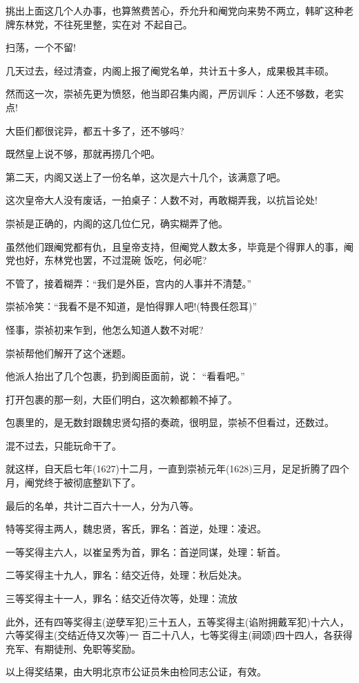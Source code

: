 \documentclass[11pt,a4paper,onecolumn]{article}
\begin{document}
挑出上面这几个人办事，也算煞费苦心，乔允升和阉党向来势不两立，韩旷这种老牌东林党，不往死里整，实在对
不起自己。

扫荡，一个不留!

几天过去，经过清查，内阁上报了阉党名单，共计五十多人，成果极其丰硕。

然而这一次，崇祯先更为愤怒，他当即召集内阁，严厉训斥：人还不够数，老实点!

大臣们都很诧异，都五十多了，还不够吗?

既然皇上说不够，那就再捞几个吧。

第二天，内阁又送上了一份名单，这次是六十几个，该满意了吧。

这次皇帝大人没有废话，一拍桌子：人数不对，再敢糊弄我，以抗旨论处!

崇祯是正确的，内阁的这几位仁兄，确实糊弄了他。

虽然他们跟阉党都有仇，且皇帝支持，但阉党人数太多，毕竟是个得罪人的事，阉党也好，东林党也罢，不过混碗
饭吃，何必呢?

不管了，接着糊弄：``我们是外臣，宫内的人事并不清楚。''

崇祯冷笑：``我看不是不知道，是怕得罪人吧!(特畏任怨耳)''

怪事，崇祯初来乍到，他怎么知道人数不对呢?

崇祯帮他们解开了这个迷题。

他派人抬出了几个包裹，扔到阁臣面前，说： ``看看吧。''

打开包裹的那一刻，大臣们明白，这次赖都赖不掉了。

包裹里的，是无数封跟魏忠贤勾搭的奏疏，很明显，崇祯不但看过，还数过。

混不过去，只能玩命干了。

就这样，自天启七年(1627)十二月，一直到崇祯元年(1628)三月，足足折腾了四个月，阉党终于被彻底整趴下了。

最后的名单，共计二百六十一人，分为八等。

特等奖得主两人，魏忠贤，客氏，罪名：首逆，处理：凌迟。

一等奖得主六人，以崔呈秀为首，罪名：首逆同谋，处理：斩首。

二等奖得主十九人，罪名：结交近侍，处理：秋后处决。

三等奖得主十一人，罪名：结交近侍次等，处理：流放

此外，还有四等奖得主(逆孽军犯)三十五人，五等奖得主(谄附拥戴军犯)十六人，六等奖得主(交结近侍又次等)一
百二十八人，七等奖得主(祠颂)四十四人，各获得充军、有期徒刑、免职等奖励。

以上得奖结果，由大明北京市公证员朱由检同志公证，有效。
\end{document}
